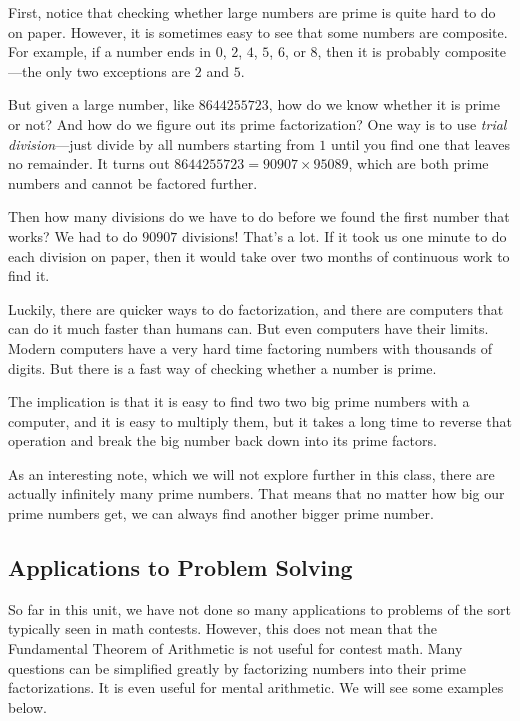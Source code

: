 \documentclass[a4paper,10pt]{report}
\begin{document}
First, notice that checking whether large numbers are prime is quite hard to do
on paper. However, it is sometimes easy to see that some numbers are composite.
For example, if a number ends in \(0\), \(2\), \(4\), \(5\), \(6\), or \(8\),
then it is probably composite---the only two exceptions are \(2\) and \(5\).

But given a large number, like \(8644255723\), how do we know whether it is
prime or not? And how do we figure out its prime factorization? One way is to
use \emph{trial division}---just divide by all numbers starting from \(1\)
until you find one that leaves no remainder. It turns out \(8644255723 =
90907\times95089\), which are both prime numbers and cannot be factored
further.

Then how many divisions do we have to do before we found the first number that
works? We had to do \(90907\) divisions! That's a lot. If it took us one minute
to do each division on paper, then it would take over two months of continuous
work to find it.

Luckily, there are quicker ways to do factorization, and there are computers
that can do it much faster than humans can. But even computers have their
limits. Modern computers have a very hard time factoring numbers with thousands
of digits. But there is a fast way of checking whether a number is prime.

The implication is that it is easy to find two two big prime numbers with a
computer, and it is easy to multiply them, but it takes a long time to reverse
that operation and break the big number back down into its prime factors.

As an interesting note, which we will not explore further in this class, there
are actually infinitely many prime numbers. That means that no matter how big
our prime numbers get, we can always find another bigger prime number.

\subsection{Applications to Problem Solving}

So far in this unit, we have not done so many applications to problems of the
sort typically seen in math contests. However, this does not mean that the
Fundamental Theorem of Arithmetic is not useful for contest math. Many
questions can be simplified greatly by factorizing numbers into their prime
factorizations. It is even useful for mental arithmetic. We will see some
examples below.
\end{document}
